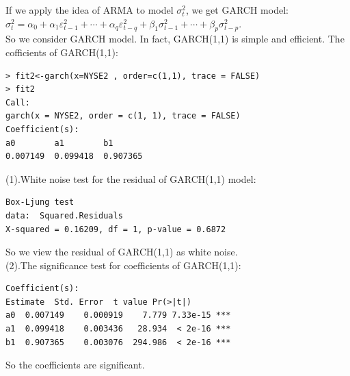\documentclass[twoside,11pt]{article}
\begin{document}
If we apply the idea of ARMA to model $\sigma_{t}^{2}$, we get GARCH model:\\
$\sigma_{t}^{2}=\alpha_{0}+\alpha_{1} \varepsilon_{t-1}^{2}+\cdots+\alpha_{q} \varepsilon_{t-q}^{2}+\beta_{1} \sigma_{t-1}^{2}+\cdots+\beta_{p} \sigma_{t-p}^{2}.$\\

So we consider GARCH model. In fact, GARCH(1,1) is simple and efficient. The cofficients of GARCH(1,1):
\begin{verbatim}
> fit2<-garch(x=NYSE2 , order=c(1,1), trace = FALSE)
> fit2
Call:
garch(x = NYSE2, order = c(1, 1), trace = FALSE)
Coefficient(s):
a0        a1        b1
0.007149  0.099418  0.907365  
\end{verbatim}
(1).White noise test for the residual of GARCH(1,1) model:
\begin{verbatim}
Box-Ljung test
data:  Squared.Residuals
X-squared = 0.16209, df = 1, p-value = 0.6872
\end{verbatim}
\noindent So we view the residual of GARCH(1,1) as white noise.\\

\noindent (2).The significance test for coefficients of GARCH(1,1):
\begin{verbatim}
Coefficient(s):
Estimate  Std. Error  t value Pr(>|t|)
a0  0.007149    0.000919    7.779 7.33e-15 ***
a1  0.099418    0.003436   28.934  < 2e-16 ***
b1  0.907365    0.003076  294.986  < 2e-16 ***
\end{verbatim}
So the coefficients are significant.\\
\end{document}

